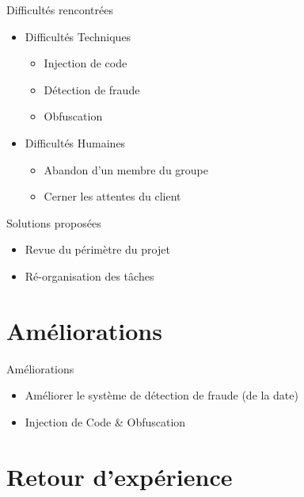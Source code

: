 \documentclass{cubeamer}
\begin{document}
\begin{frame}{Difficultés rencontrées}
    \begin{itemize}
        \item Difficultés Techniques 
              \begin{itemize}
                \item Injection de code
                \item Détection de fraude
                \item Obfuscation
              \end{itemize}
        \item Difficultés Humaines
              \begin{itemize}
                \item Abandon d'un membre du groupe
                \item Cerner les attentes du client
              \end{itemize}
    \end{itemize}
\end{frame}

\begin{frame}{Solutions proposées}
    \begin{itemize}
        \item Revue du périmètre du projet
        \item Ré-organisation des tâches
    \end{itemize}
\end{frame}

\section{Améliorations}

\begin{frame}{Améliorations}
    \begin{itemize}
        \item Améliorer le système de détection de fraude (de la date)
        \item Injection de Code \& Obfuscation
    \end{itemize}
\end{frame}

\section{Retour d'expérience}
\end{document}
